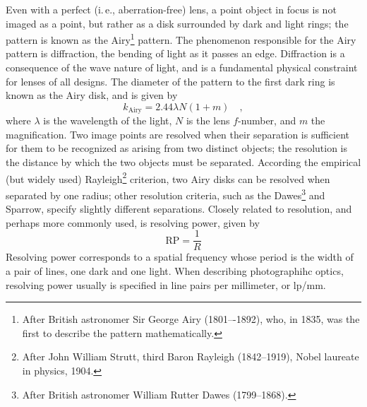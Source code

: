 \documentclass[11pt, oneside]{scrartcl}   	%
\begin{document}
Even with a perfect (i.\,e., aberration-free) lens, a point object in
focus is not imaged as a point, but rather as a disk surrounded by
dark and light rings; the pattern is known as the Airy\footnote{After
  British astronomer Sir George Airy (1801–-1892), who, in 1835, was
  the first to describe the pattern mathematically.} pattern. The
phenomenon responsible for the Airy pattern is diffraction, the
bending of light as it passes an edge. Diffraction is a consequence of
the wave nature of light, and is a fundamental physical constraint for
lenses of all designs. The diameter of the pattern to the first dark
ring is known as the Airy disk, and is given by
\begin{equation}
  \label{eq:airy}
   k_\mathrm{Airy} = 2.44\lambda N(1+m)\quad,
\end{equation}
where $\lambda$ is the wavelength of the light, $N$ is the lens
$f$-number, and $m$ the magnification. Two image points are resolved
when their separation is sufficient for them to be recognized as
arising from two distinct objects; the resolution is the distance by
which the two objects must be separated. According the empirical (but
widely used) Rayleigh\footnote{After John William Strutt, third Baron
  Rayleigh (1842–1919), Nobel laureate in physics, 1904.} criterion,
two Airy disks can be resolved when separated by one radius; other
resolution criteria, such as the Dawes\footnote{After British
  astronomer William Rutter Dawes (1799–1868).} and Sparrow, specify
slightly different separations. Closely related to resolution, and
perhaps more commonly used, is resolving power, given by
\begin{equation}
  \label{eq:respow}
  \mathrm{RP} = \frac 1 R
\end{equation}
Resolving power corresponds to a spatial frequency whose period is the width of a pair of lines, one dark and one light. When describing photographihc optics, resolving power usually is specified in line pairs per millimeter, or lp/mm.
\end{document}
